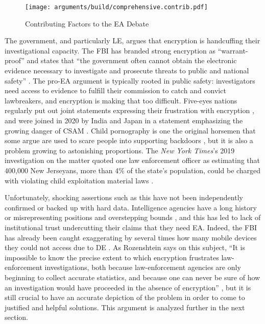 \begin{sidewaysfigure}
  \centering\CaptionFontSize
  \texttt{[image: arguments/build/comprehensive.contrib.pdf]}
  \caption{Contributing Factors to the EA Debate}
  \label{fig-args-contrib}
\end{sidewaysfigure}

The government, and particularly \acl{LE}, argues that encryption is handcuffing their investigational capacity. The
\ac{FBI} has branded strong encryption as ``warrant-proof'' and states that ``the government often cannot obtain the
electronic evidence necessary to investigate and prosecute threats to public and national safety'' \cite{fbi_2020}. The
pro-\ac{EA} argument is typically rooted in public safety: investigators need access to evidence to fulfill their
commission to catch and convict lawbreakers, and encryption is making that too difficult. Five-eyes nations regularly
put out joint statements expressing their frustration with encryption \cite{ministerial_2018} \cite{goodale_2017}, and
were joined in 2020 by India and Japan in a statement emphasizing the growing danger of \ac{CSAM} \cite{intl_2020}.
Child pornography is one the original \ac{horsemen} that some argue are used to scare people into supporting backdoors
\cite{schneier_scaring_2019}, but it is also a problem growing to astonishing proportions. The \textit{New York Times}'s
2019 investigation on the matter quoted one law enforcement officer as estimating that 400,000 New Jerseyans, more than
4\% of the state's population, could be charged with violating child exploitation material laws
\cite{keller_internet_2019}.

Unfortunately, shocking assertions such as this have not been independently confirmed or backed up with hard data.
Intelligence agencies have a long history or misrepresenting positions and overstepping bounds
\cite{johnson_congressional_2004} \cite{shamsi_2011}, and this has led to lack of institutional trust undercutting their
claims that they need \ac{EA}. Indeed, the \ac{FBI} has already been caught exaggerating by several times how many
mobile devices they could not access due to \acl{DE} \cite{devlin_2018}. As Rozenshtein says on this subject, ``It is
impossible to know the precise extent to which encryption frustrates law-enforcement investigations, both because
law-enforcement agencies are only beginning to collect accurate statistics, and because one can never be sure of how an
investigation would have proceeded in the absence of encryption'' \cite{rozenshtein_wicked_2018}, but it is still
crucial to have an accurate depiction of the problem in order to come to justified and helpful solutions. This argument
is analyzed further in the next section.

